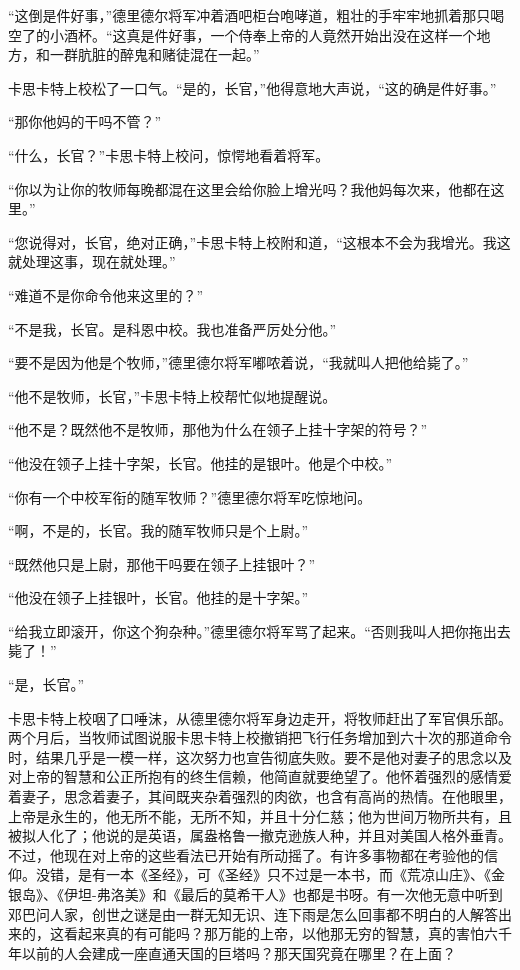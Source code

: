     “这倒是件好事，”德里德尔将军冲着酒吧柜台咆哮道，粗壮的手牢牢地抓着那只喝空了的小酒杯。“这真是件好事，一个侍奉上帝的人竟然开始出没在这样一个地方，和一群肮脏的醉鬼和赌徒混在一起。”

    卡思卡特上校松了一口气。“是的，长官，”他得意地大声说，“这的确是件好事。”

    “那你他妈的干吗不管？”

    “什么，长官？”卡思卡特上校问，惊愕地看着将军。

    “你以为让你的牧师每晚都混在这里会给你脸上增光吗？我他妈每次来，他都在这里。”

    “您说得对，长官，绝对正确，”卡思卡特上校附和道，“这根本不会为我增光。我这就处理这事，现在就处理。”

    “难道不是你命令他来这里的？”

    “不是我，长官。是科恩中校。我也准备严厉处分他。”

    “要不是因为他是个牧师，”德里德尔将军嘟哝着说，“我就叫人把他给毙了。”

    “他不是牧师，长官，”卡思卡特上校帮忙似地提醒说。

    “他不是？既然他不是牧师，那他为什么在领子上挂十字架的符号？”

    “他没在领子上挂十字架，长官。他挂的是银叶。他是个中校。”

    “你有一个中校军衔的随军牧师？”德里德尔将军吃惊地问。

    “啊，不是的，长官。我的随军牧师只是个上尉。”

    “既然他只是上尉，那他干吗要在领子上挂银叶？”

    “他没在领子上挂银叶，长官。他挂的是十字架。”

    “给我立即滚开，你这个狗杂种。”德里德尔将军骂了起来。“否则我叫人把你拖出去毙了！”

    “是，长官。”

    卡思卡特上校咽了口唾沫，从德里德尔将军身边走开，将牧师赶出了军官俱乐部。两个月后，当牧师试图说服卡思卡特上校撤销把飞行任务增加到六十次的那道命令时，结果几乎是一模一样，这次努力也宣告彻底失败。要不是他对妻子的思念以及对上帝的智慧和公正所抱有的终生信赖，他简直就要绝望了。他怀着强烈的感情爱着妻子，思念着妻子，其间既夹杂着强烈的肉欲，也含有高尚的热情。在他眼里，上帝是永生的，他无所不能，无所不知，并且十分仁慈；他为世间万物所共有，且被拟人化了；他说的是英语，属盎格鲁一撤克逊族人种，并且对美国人格外垂青。不过，他现在对上帝的这些看法已开始有所动摇了。有许多事物都在考验他的信仰。没错，是有一本《圣经》，可《圣经》只不过是一本书，而《荒凉山庄》、《金银岛》、《伊坦-弗洛美》和《最后的莫希干人》也都是书呀。有一次他无意中听到邓巴问人家，创世之谜是由一群无知无识、连下雨是怎么回事都不明白的人解答出来的，这看起来真的有可能吗？那万能的上帝，以他那无穷的智慧，真的害怕六千年以前的人会建成一座直通天国的巨塔吗？那天国究竟在哪里？在上面？

